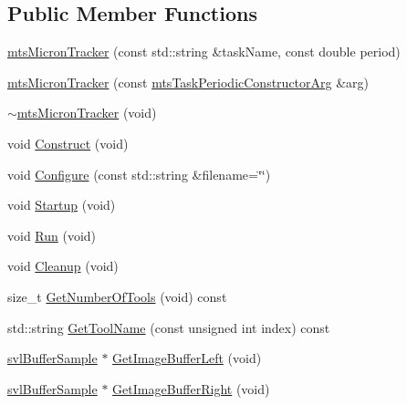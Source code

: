 \subsection*{Public Member Functions}
\begin{DoxyCompactItemize}
\item 
\hyperlink{classmts_micron_tracker_a0b790611b1fc0d4ed289aa8b8accb170}{mts\+Micron\+Tracker} (const std\+::string \&task\+Name, const double period)
\item 
\hyperlink{classmts_micron_tracker_a5fa387f0547c0da7016fdcd224c28766}{mts\+Micron\+Tracker} (const \hyperlink{classmts_task_periodic_constructor_arg}{mts\+Task\+Periodic\+Constructor\+Arg} \&arg)
\item 
\hyperlink{classmts_micron_tracker_acf5f550a10bc1e38682278f11daf840d}{$\sim$mts\+Micron\+Tracker} (void)
\item 
void \hyperlink{classmts_micron_tracker_a65561ad5a44077e94cbccc155686ef90}{Construct} (void)
\item 
void \hyperlink{classmts_micron_tracker_a10459ab3727e97aa19e74c95c151ee75}{Configure} (const std\+::string \&filename=\char`\"{}\char`\"{})
\item 
void \hyperlink{classmts_micron_tracker_aff4c78dc362a728ad6a44f0d2b9242aa}{Startup} (void)
\item 
void \hyperlink{classmts_micron_tracker_a6445add41169ec175e0aff27432c930d}{Run} (void)
\item 
void \hyperlink{classmts_micron_tracker_a1f62513238bb096abede1f9a87317275}{Cleanup} (void)
\item 
size\+\_\+t \hyperlink{classmts_micron_tracker_a86af64a44ae5a1cb9ad0981a67af73df}{Get\+Number\+Of\+Tools} (void) const 
\item 
std\+::string \hyperlink{classmts_micron_tracker_a58f8d0a2e2ddf0547b3c9f6d91481769}{Get\+Tool\+Name} (const unsigned int index) const 
\item 
\hyperlink{classsvl_buffer_sample}{svl\+Buffer\+Sample} $\ast$ \hyperlink{classmts_micron_tracker_a1b988bae0806ea0a8c44377e80d16bf4}{Get\+Image\+Buffer\+Left} (void)
\item 
\hyperlink{classsvl_buffer_sample}{svl\+Buffer\+Sample} $\ast$ \hyperlink{classmts_micron_tracker_a7d8f186eaf36a43326dc9954a1d7fd32}{Get\+Image\+Buffer\+Right} (void)
\end{DoxyCompactItemize}
